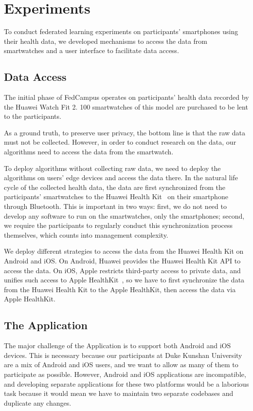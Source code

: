 \section{\fedcampus Experiments}

To conduct federated learning experiments on participants' smartphones using
their health data,
we developed mechanisms to access the data from smartwatches and a user
interface to facilitate data access.

\subsection{Data Access}

The initial phase of FedCampus operates on participants' health data recorded by
the Huawei Watch Fit 2.
100 smartwatches of this model are purchased to be lent to the participants.

As a ground truth, to preserve user privacy,
the bottom line is that the raw data must not be collected.
However, in order to conduct research on the data,
our algorithms need to access the data from the smartwatch.

To deploy algorithms without collecting raw data,
we need to deploy the algorithms on users' edge devices and
access the data there.
In the natural life cycle of the collected health data,
the data are first synchronized from the participants' smartwatches to
the Huawei Health Kit~\cite{huaweihealthkit} on
their smartphone through Bluetooth.
This is important in two ways:
first, we do not need to develop any software to run on the smartwatches,
only the smartphones; second,
we require the participants to regularly conduct this synchronization process
themselves, which counts into management complexity.

We deploy different strategies to access the data from the Huawei Health Kit on
Android and iOS.
On Android, Huawei provides the Huawei Health Kit API to access the data.
On iOS, Apple restricts third-party access to private data,
and unifies such access to Apple HealthKit~\cite{applehealthkit},
so we have to first synchronize the data from the Huawei Health Kit to
the Apple HealthKit, then access the data via Apple HealthKit.

\subsection{The \fedcampus Application}

The major challenge of the \fedcampus Application is to
support both Android and iOS devices.
This is necessary because our participants at Duke Kunshan University are
a mix of Android and iOS users,
and we want to allow as many of them to participate as possible.
However, Android and iOS applications are incompatible,
and developing separate applications for these two platforms would be
a laborious task because
it would mean we have to maintain two separate codebases and
duplicate any changes.

